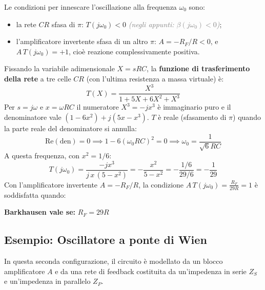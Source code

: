 Le condizioni per innescare l'oscillazione alla frequenza $\omega_0$ sono:
\begin{itemize}[itemsep=1.5ex]
    \item la rete $CR$ sfasa di $\pi$: $T(j\omega_0) < 0$ \quad \textcolor{gray}{\small \textit{(negli appunti: $\beta(j\omega_0)<0$)}};
    \item l'amplificatore invertente sfasa di un altro $\pi$: $A = -R_F/R < 0$, e $A\,T(j\omega_0) = +1$, cioè reazione complessivamente positiva.
\end{itemize}

Fissando la variabile adimensionale $X = sRC$, la \textbf{funzione di trasferimento della rete} a tre celle $CR$ (con l'ultima resistenza a massa virtuale) è:
\[
T(X) = \frac{X^3}{1 + 5X + 6X^2 + X^3}
\]
Per $s = j\omega$ e $x = \omega RC$ il numeratore $X^3 = -jx^3$ è immaginario puro e il denominatore vale $(1-6x^2) + j(5x - x^3)$. $T$ è reale (sfasamento di $\pi$) quando la parte reale del denominatore si annulla:
\[
\text{Re}(\text{den}) = 0 \implies 1 - 6(\omega_0 RC)^2 = 0 \implies \omega_0 = \frac{1}{\sqrt{6}RC}
\]
A questa frequenza, con $x^2 = 1/6$:
\[
T(j\omega_0) = \frac{-jx^3}{j\,x\,(5 - x^2)} = -\frac{x^2}{5 - x^2} = -\frac{1/6}{29/6} = -\frac{1}{29}
\]
Con l'amplificatore invertente $A = -R_F/R$, la condizione $A\,T(j\omega_0) = \frac{R_F}{29R} = 1$ è soddisfatta quando:
\begin{important}
\textbf{Barkhausen vale se: } $R_F = 29R$
\end{important}


\subsection{Esempio: Oscillatore a ponte di Wien}

In questa seconda configurazione, il circuito è modellato da un blocco amplificatore $A$ e da una rete di feedback costituita da un'impedenza in serie $Z_S$ e un'impedenza in parallelo $Z_P$.

